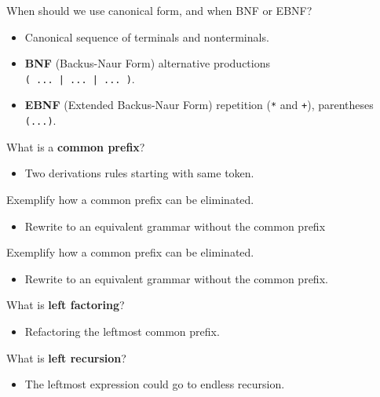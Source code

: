 \documentclass[11pt]{beamer}
\begin{document}
\begin{frame}

\begin{block}{When should we use canonical form, and when BNF or EBNF?}
\begin{itemize}
\item Canonical sequence of terminals and nonterminals.
\item \textbf{BNF} (Backus-Naur Form) alternative productions\\ \texttt{( ... | ... | ... )}.
\item \textbf{EBNF} (Extended Backus-Naur Form) repetition (\texttt{*} and \texttt{+}), parentheses \texttt{(...)}.
\end{itemize}
\end{block}


\begin{block}{What is a \textbf{common prefix}?}
\begin{itemize}
\item Two derivations rules starting with same token.
\end{itemize}
\end{block}


\begin{block}{Exemplify how a common prefix can be eliminated.}
\begin{itemize}
\item Rewrite to an equivalent grammar without the common prefix
\end{itemize}
\end{block}


\end{frame}

\begin{frame}

\begin{block}{Exemplify how a common prefix can be eliminated.}
\begin{itemize}
\item Rewrite to an equivalent grammar without the common prefix.
\end{itemize}
\end{block}


\begin{block}{What is \textbf{left factoring}?}
\begin{itemize}
\item Refactoring the leftmost common prefix.
\end{itemize}
\end{block}

\begin{block}{What is \textbf{left recursion}?}
\begin{itemize}
\item The leftmost expression could go to endless recursion.
\end{itemize}
\end{block}

\end{frame}
\end{document}
